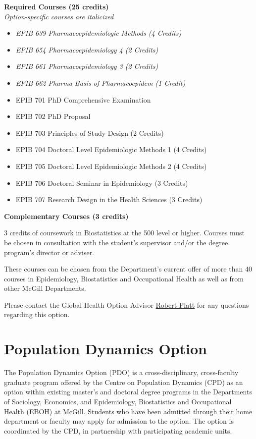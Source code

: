 \documentclass[
]{book}
\providecommand{\tightlist}{%
  \setlength{\itemsep}{0pt}\setlength{\parskip}{0pt}}
\begin{document}
\textbf{Required Courses (25 credits)}\\
\emph{Option-specific courses are italicized}

\begin{itemize}
\tightlist
\item
  \emph{EPIB 639 Pharmacoepidemiologic Methods (4 Credits)}
\item
  \emph{EPIB 654 Pharmacoepidemiology 4 (2 Credits)}
\item
  \emph{EPIB 661 Pharmacoepidemiology 3 (2 Credits)}
\item
  \emph{EPIB 662 Pharma Basis of Pharmacoepidem (1 Credit)}
\item
  EPIB 701 PhD Comprehensive Examination
\item
  EPIB 702 PhD Proposal
\item
  EPIB 703 Principles of Study Design (2 Credits)
\item
  EPIB 704 Doctoral Level Epidemiologic Methods 1 (4 Credits)
\item
  EPIB 705 Doctoral Level Epidemiologic Methods 2 (4 Credits)
\item
  EPIB 706 Doctoral Seminar in Epidemiology (3 Credits)
\item
  EPIB 707 Research Design in the Health Sciences (3 Credits)
\end{itemize}

\textbf{Complementary Courses (3 credits)}

3 credits of coursework in Biostatistics at the 500 level or higher. Courses must be chosen in consultation with the student's supervisor and/or the degree program's director or adviser.

These courses can be chosen from the Department's current offer of more than 40 courses in Epidemiology, Biostatistics and Occupational Health as well as from other McGill Departments.

Please contact the Global Health Option Advisor \href{mailto:robert.platt@mcgill.ca}{Robert Platt} for any questions regarding this option.

\hypertarget{population-dynamics-option}{%
\section{Population Dynamics Option}\label{population-dynamics-option}}

The Population Dynamics Option (PDO) is a cross-disciplinary, cross-faculty graduate program offered by the Centre on Population Dynamics (CPD) as an option within existing master's and doctoral degree programs in the Departments of Sociology, Economics, and Epidemiology, Biostatistics and Occupational Health (EBOH) at McGill. Students who have been admitted through their home department or faculty may apply for admission to the option. The option is coordinated by the CPD, in partnership with participating academic units.
\end{document}
